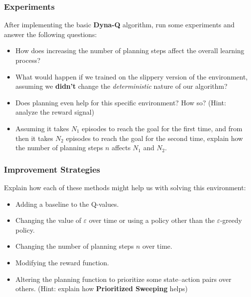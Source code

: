 \subsubsection{Experiments}
After implementing the basic \textbf{Dyna-Q} algorithm, run some experiments and answer the following questions:
\begin{itemize} 
    \item How does increasing the number of planning steps affect the overall learning process? 
    \item What would happen if we trained on the slippery version of the environment, assuming we \textbf{didn't} change the \textit{deterministic} nature of our algorithm? 
    \item Does planning even help for this specific environment? How so? (Hint: analyze the reward signal) 
    \item Assuming it takes $N_1$ episodes to reach the goal for the first time, and from then it takes $N_2$ episodes to reach the goal for the second time, explain how the number of planning steps $n$ affects $N_1$ and $N_2$.
\end{itemize}

\vspace*{0.3cm}
\subsubsection{Improvement Strategies}
Explain how each of these methods might help us with solving this environment:
\begin{itemize} 
    \item Adding a baseline to the Q-values. 
    \item Changing the value of $\varepsilon$ over time or using a policy other than the $\varepsilon$-greedy policy. 
    \item Changing the number of planning steps $n$ over time. 
    \item Modifying the reward function. 
    \item Altering the planning function to prioritize some state–action pairs over others. (Hint: explain how \textbf{Prioritized Sweeping} helps) 
\end{itemize}